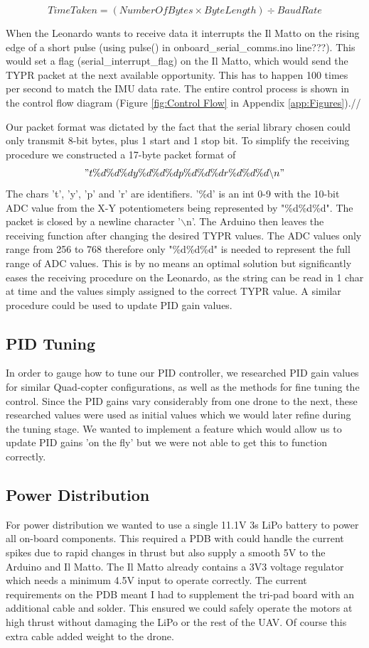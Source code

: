 \documentclass[a4paper,11pt]{article}
\begin{document}
\begin{equation}
Time Taken = (Number Of Bytes \times Byte Length) \div Baud Rate
\label{eqn:Data Rate}
\end{equation} 

 When the Leonardo wants to receive data it interrupts the Il Matto on the rising edge of a short pulse (using pulse() in onboard\_serial\_comms.ino line???). This would set a flag (serial\_interrupt\_flag) on the Il Matto, which would send the TYPR packet at the next available opportunity. This has to happen 100 times per second to match the IMU data rate. The entire control process is shown in the control flow diagram (Figure \ref{fig:Control Flow} in Appendix \ref{app:Figures}).//
 
Our packet format was dictated by the fact that the serial library chosen could only transmit 8-bit bytes, plus 1 start and 1 stop bit. To simplify the receiving procedure we constructed a 17-byte packet format of \["t\%d\%d\%dy\%d\%d\%dp\%d\%d\%dr\%d\%d\%d\backslash n"\]
The chars 't', 'y', 'p' and 'r' are identifiers. '\%d' is an int 0-9 with the 10-bit ADC value from the X-Y potentiometers being represented by "\%d\%d\%d". The packet is closed by a newline character '$\backslash$n'. The Arduino then leaves the receiving function after changing the desired TYPR values. The ADC values only range from 256 to 768 therefore only "\%d\%d\%d" is needed to represent the full range of ADC values. This is by no means an optimal solution but significantly eases the receiving procedure on the Leonardo, as the string can be read in 1 char at time and the values simply assigned to the correct TYPR value. A similar procedure could be used to update PID gain values.  


\subsection{PID Tuning}
In order to gauge how to tune our PID controller, we researched PID gain values for similar Quad-copter configurations, as well as the methods for fine tuning the control. Since the PID gains vary considerably from one drone to the next, these researched values were used as initial values which we would later refine during the tuning stage. We wanted to implement a feature which would allow us to update PID gains 'on the fly' but we were not able to get this to function correctly.
\subsection{Power Distribution}
For power distribution we wanted to use a single 11.1V 3s LiPo battery to power all on-board components. This required a PDB with could handle the current spikes due to rapid changes in thrust but also supply a smooth 5V to the Arduino and Il Matto. The Il Matto already contains a 3V3 voltage regulator which needs a minimum 4.5V input to operate correctly. The current requirements on the PDB meant I had to supplement the tri-pad board with an additional cable and solder. This ensured we could safely operate the motors at high thrust without damaging the LiPo or the rest of the UAV. Of course this extra cable added weight to the drone. 
\end{document}
